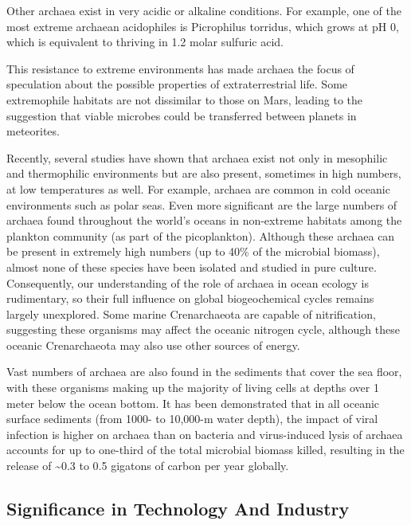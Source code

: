 Other archaea exist in very acidic or alkaline conditions. For example, one of the most extreme archaean acidophiles is Picrophilus torridus, which grows at pH 0, which is equivalent to thriving in 1.2 molar sulfuric acid.

This resistance to extreme environments has made archaea the focus of speculation about the possible properties of extraterrestrial life. Some extremophile habitats are not dissimilar to those on Mars, leading to the suggestion that viable microbes could be transferred between planets in meteorites.

Recently, several studies have shown that archaea exist not only in mesophilic and thermophilic environments but are also present, sometimes in high numbers, at low temperatures as well. For example, archaea are common in cold oceanic environments such as polar seas. Even more significant are the large numbers of archaea found throughout the world's oceans in non-extreme habitats among the plankton community (as part of the picoplankton). Although these archaea can be present in extremely high numbers (up to 40\% of the microbial biomass), almost none of these species have been isolated and studied in pure culture. Consequently, our understanding of the role of archaea in ocean ecology is rudimentary, so their full influence on global biogeochemical cycles remains largely unexplored. Some marine Crenarchaeota are capable of nitrification, suggesting these organisms may affect the oceanic nitrogen cycle, although these oceanic Crenarchaeota may also use other sources of energy.

Vast numbers of archaea are also found in the sediments that cover the sea floor, with these organisms making up the majority of living cells at depths over 1 meter below the ocean bottom. It has been demonstrated that in all oceanic surface sediments (from 1000- to 10,000-m water depth), the impact of viral infection is higher on archaea than on bacteria and virus-induced lysis of archaea accounts for up to one-third of the total microbial biomass killed, resulting in the release of \textasciitilde0.3 to 0.5 gigatons of carbon per year globally.

\hypertarget{significance-in-technology-and-industry-1}{%
\subsection{Significance in Technology And Industry}\label{significance-in-technology-and-industry-1}}

